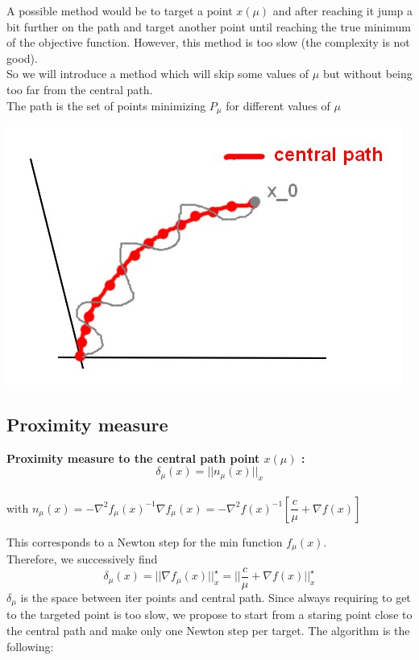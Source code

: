 A possible method would be to target a point $x(\mu)$ and after reaching it jump a bit further on the path and target another point until reaching the true minimum of the objective function. However, this method is too slow (the complexity is not good).\\
So we will introduce a method which will skip some values of $\mu$ but without being too far from the central path.\\
The path is the set of points minimizing $P_\mu$ for different values of $\mu$
\begin{center}
\includegraphics[scale=0.3]{images/12-fig2.jpg} 
\end{center}

\subsection{Proximity measure}
\begin{definition} \textbf{Proximity measure to the central path point $x(\mu)$ :}\\ $$ \delta_{\mu}(x) = || n_{\mu}(x) ||_x $$\\
 with $n_{\mu}(x) = - \nabla^2 f_{\mu}(x)^{-1} \nabla f_{\mu}(x) = - \nabla^2 f(x)^{-1} [\dfrac{c}{\mu} + \nabla f(x)]$\\
\end{definition}

 This corresponds to a Newton step for the min function $f_{\mu}(x)$.\\ Therefore, we successively find
$$\delta_{\mu}(x) = || \nabla f_{\mu}(x) ||_x^{\star} = || \dfrac{c}{\mu} + \nabla f(x) ||_x^{\star}$$
$\delta_{\mu}$ is the space between iter points and central path. Since always requiring to get to the targeted point is too slow, we propose to start from a staring point close to the central path and make only one Newton step per target. The algorithm is the following:\\

